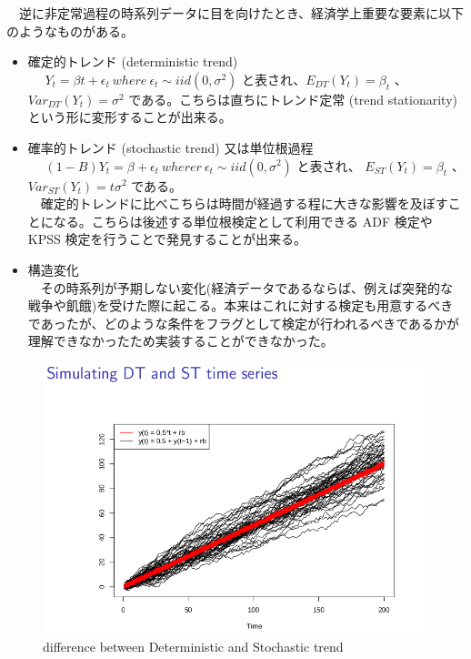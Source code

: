 \documentclass[dvipdfmx]{scrartcl}
\begin{document}
　逆に非定常過程の時系列データに目を向けたとき、経済学上重要な要素に以下のようなものがある。\\
\begin{itemize}
\item 確定的トレンド (deterministic trend)\\
　 \(Y_t = \beta t + \epsilon_t \ where \ \epsilon_t \sim iid(0, \sigma^2)\) と表され、\(E_{DT}(Y_t) = \beta_t\) 、 \(Var_{DT}(Y_t) = \sigma^2\) である。こちらは直ちにトレンド定常 (trend stationarity) という形に変形することが出来る。\\
\item 確率的トレンド (stochastic trend) 又は単位根過程\\
　 \((1-B)Y_t = \beta + \epsilon_t \ wherer \ \epsilon_t \sim iid(0,\sigma^2)\) と表され、 \(E_{ST}(Y_t) = \beta_t\) 、 \(Var_{ST}(Y_t) = t \sigma^2\) である。\\
　確定的トレンドに比べこちらは時間が経過する程に大きな影響を及ぼすことになる。こちらは後述する単位根検定として利用できる ADF 検定や KPSS 検定を行うことで発見することが出来る。\\
\item 構造変化\\
　その時系列が予期しない変化(経済データであるならば、例えば突発的な戦争や飢餓)を受けた際に起こる。本来はこれに対する検定も用意するべきであったが、どのような条件をフラグとして検定が行われるべきであるかが理解できなかったため実装することができなかった。\\
\end{itemize}

\begin{figure}[htbp]
\centering
\includegraphics[width=16cm]{./hedibert.png}
\caption{difference between Deterministic and Stochastic trend \cite{hedibert}}
\end{figure}
\end{document}
